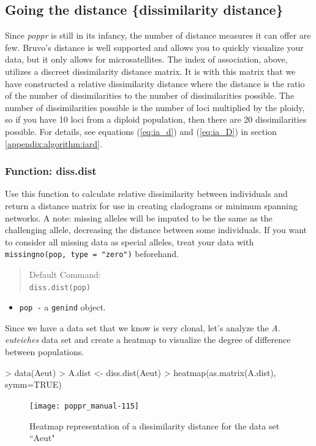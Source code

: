 \documentclass[letterpaper]{article}
\newcommand{\tab}{\hspace*{1em}}
\begin{document}
\subsection{Going the distance \{dissimilarity distance\}}\label{index:dist}
\tab\tab Since \textit{poppr} is still in its infancy, the number of distance measures it can offer are few. Bruvo's distance is well supported and allows you to quickly visualize your data, but it only allows for microsatellites. The index of association, above, utilizes a discreet dissimilarity distance matrix. It is with this matrix that we have constructed a relative dissimilarity distance where the distance is the ratio of the number of dissimilarities to the number of dissimilarities possible. The number of dissimilarities possible is the number of loci multiplied by the ploidy, so if you have 10 loci from a diploid population, then there are 20 dissimilarities possible. For details, see equations (\ref{eq:ia_d}) and (\ref{eq:ia_D}) in section \ref{appendix:algorithm:iard}. 

\subsubsection{Function: diss.dist}\label{index:dist:diss.dist}

\tab\tab Use this function to calculate relative dissimilarity between individuals and return a distance matrix for use in creating cladograms or minimum spanning networks. A note: missing alleles will be imputed to be the same as the challenging allele, decreasing the distance between some individuals. If you want to consider all missing data as special alleles, treat your data with \texttt{missingno(pop, type = "zero")} beforehand. 

\begin{quote}
Default Command:\\
\texttt{diss.dist(pop)}
\end{quote}

\begin{itemize}
  \item \texttt{pop -} a \texttt{genind} object. 
\end{itemize}
Since we have a data set that we know is very clonal, let's analyze the \textit{A. euteiches} data set \cite{Grunwald:2006} and create a heatmap to visualize the degree of difference between populations.
\begin{Schunk}
\begin{Sinput}
> data(Aeut)
> A.dist <- diss.dist(Aeut)
> heatmap(as.matrix(A.dist), symm=TRUE)
\end{Sinput}
\end{Schunk}
\begin{figure}[h!]
  \centering
  \caption{\footnotesize Heatmap representation of a dissimilarity distance for the data set ``Aeut"}
  \label{diss_heat_map}
\texttt{[image: poppr\_manual-115]}
\end{figure}
\newpage
\end{document}
